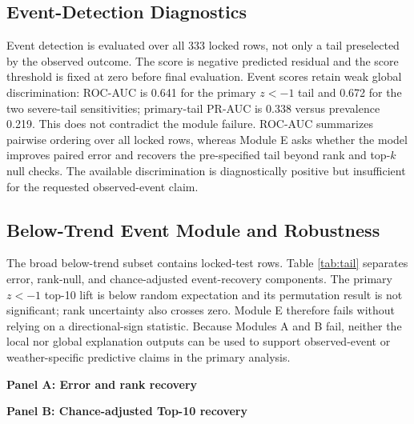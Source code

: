 \documentclass[conference]{IEEEtran}
\renewcommand{\arraystretch}{0.98}
\begin{document}
\subsection{Event-Detection Diagnostics}
Event detection is evaluated over all 333 locked rows, not only a tail preselected
by the observed outcome. The score is negative predicted residual and the score
threshold is fixed at zero before final evaluation. Event scores retain weak
global discrimination: ROC-AUC is 0.641 for the primary $z<-1$ tail and 0.672 for
the two severe-tail sensitivities; primary-tail PR-AUC is 0.338 versus prevalence
0.219. This does not contradict the module failure. ROC-AUC summarizes pairwise
ordering over all locked rows, whereas Module E asks whether the model improves
paired error and recovers the pre-specified tail beyond rank and top-$k$ null
checks. The available discrimination is diagnostically positive but insufficient
for the requested observed-event claim.

\subsection{Below-Trend Event Module and Robustness}
The broad below-trend subset contains \AuditTailRows{} locked-test rows. Table
\ref{tab:tail} separates error, rank-null, and chance-adjusted event-recovery
components. The primary $z<-1$ top-10 lift is below random expectation and its
permutation result is not significant; rank uncertainty also crosses zero. Module E
therefore fails without relying on a directional-sign statistic. Because Modules A
and B fail, neither the local nor global explanation outputs can be used to
support observed-event or weather-specific predictive claims in the primary
analysis.

\begin{table}[t]
\centering
\caption{Tail components on train-only targets. Panel A reports error and rank
recovery; Panel B reports chance-adjusted Top-10 recovery. $H$ is the
hypergeometric probability and $P$ is the within-year permutation probability.
The Top-10 component passes only when lift $>1$, the lower lift CI $>1$, and both
$H$ and $P$ are $<.05$. Only $z<-1$ is primary; $z<-1.5$ passes error but fails
rank and top-k, while $z<-2$ fails the complete event module.}
\label{tab:tail}
\footnotesize
\renewcommand{\arraystretch}{1.08}
\textbf{Panel A: Error and rank recovery}\par\smallskip

\par\medskip
\textbf{Panel B: Chance-adjusted Top-10 recovery}\par\smallskip

\end{table}
\end{document}
